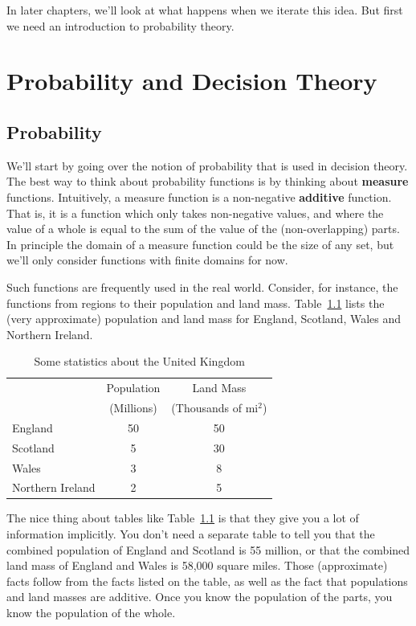 \documentclass[
  11pt,
  letterpaper,
]{scrbook}
\begin{document}
In later chapters, we'll look at what happens when we iterate this idea.
But first we need an introduction to probability theory.


\chapter{Probability and Decision Theory}\label{sec-decision-theory}

\section{Probability}\label{sec-probability}

We'll start by going over the notion of probability that is used in
decision theory. The best way to think about probability functions is by
thinking about \textbf{measure} functions. Intuitively, a measure
function is a non-negative \textbf{additive} function. That is, it is a
function which only takes non-negative values, and where the value of a
whole is equal to the sum of the value of the (non-overlapping) parts.
In principle the domain of a measure function could be the size of any
set, but we'll only consider functions with finite domains for now.

Such functions are frequently used in the real world. Consider, for
instance, the functions from regions to their population and land mass.
Table~\ref{tbl-uk-geography} lists the (very approximate) population and
land mass for England, Scotland, Wales and Northern Ireland.

\begin{longtable}[]{@{}lcc@{}}
\caption{Some statistics about the United
Kingdom}\label{tbl-uk-geography}\tabularnewline
\toprule\noalign{}
\endfirsthead
\endhead
\bottomrule\noalign{}
\endlastfoot
& Population & Land Mass \\
& (Millions) & (Thousands of mi\(^2\)) \\
England & 50 & 50 \\
Scotland & 5 & 30 \\
Wales & 3 & 8 \\
Northern Ireland & 2 & 5 \\
\end{longtable}

The nice thing about tables like Table~\ref{tbl-uk-geography} is that
they give you a lot of information implicitly. You don't need a separate
table to tell you that the combined population of England and Scotland
is 55 million, or that the combined land mass of England and Wales is
58,000 square miles. Those (approximate) facts follow from the facts
listed on the table, as well as the fact that populations and land
masses are additive. Once you know the population of the parts, you know
the population of the whole.
\end{document}
